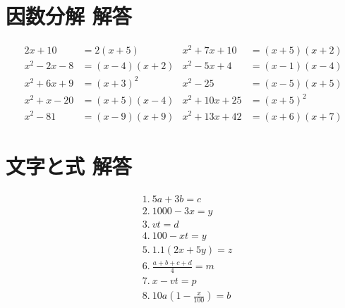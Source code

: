 \documentclass[paper=b4j,landscape,twocolumn,fleqn]{jlreq}
\begin{document}
\section{因数分解 解答}
\begin{align*}
2x+10&=2(x+5) & x^2+7x+10&=(x+5)(x+2)\\
x^2-2x-8&=(x-4)(x+2) & x^2-5x+4&=(x-1)(x-4)\\
x^2+6x+9&=(x+3)^2 & x^2-25&=(x-5)(x+5)\\
x^2+x-20&=(x+5)(x-4) & x^2+10x+25&=(x+5)^2\\
x^2-81&=(x-9)(x+9) & x^2+13x+42&=(x+6)(x+7)
\end{align*}

\section{文字と式 解答}
\begin{align*}
&1.\ 5a+3b=c\\
&2.\ 1000-3x=y\\
&3.\ vt=d\\
&4.\ 100-xt=y\\
&5.\ 1.1(2x+5y)=z\\
&6.\ \frac{a+b+c+d}{4}=m\\
&7.\ x-vt=p\\
&8.\ 10a\left(1-\frac{x}{100}\right)=b
\end{align*}
\end{document}

